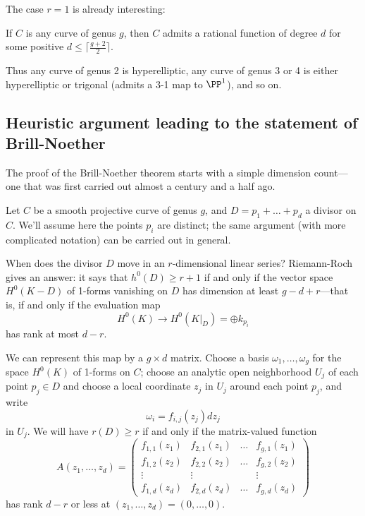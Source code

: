 The case $r=1$ is already interesting:

\begin{corollary}
If $C$ is any curve of genus $g$, then $C$ admits a rational function of degree $d$ for some positive $d \leq \lceil \frac{g+2}{2}\rceil$.
\end{corollary}

Thus any curve of genus 2 is hyperelliptic, any curve of genus 3 or 4 is either hyperelliptic or trigonal  (admits a 3-1 map to $\PP^1$), and so on.


\subsection{Heuristic argument leading to the statement of Brill-Noether}

The proof of the Brill-Noether theorem starts with a simple dimension count---one that was first carried out almost a century and a half ago. 

Let $C$ be a smooth projective curve of genus $g$, and $D = p_1 + \dots + p_d$ a divisor on $C$. We'll assume here the points $p_i$ are distinct; the same argument (with  more complicated notation) can be carried out in general.

When does the divisor $D$ move in an $r$-dimensional linear series? Riemann-Roch gives an answer: it says that $h^0(D) \geq r+1$ if and only if the vector space $H^0(K-D)$ of 1-forms vanishing on $D$ has dimension at least $g-d+r$---that is, if and only if the  evaluation map
$$
H^0(K) \to H^0(K|_D) = \oplus k_{p_i}
$$
has rank at most $d-r$. 

We can represent this map by a $g \times d$ matrix. Choose a basis $\omega_1,\dots,\omega_g$ for the space $H^0(K)$ of 1-forms on $C$; choose an analytic open neighborhood $U_j$ of each point $p_j \in D$ and choose a local coordinate $z_j$ in $U_j$ around each point $p_j$, and write
$$
\omega_i = f_{i,j}(z_j)dz_j
$$
in $U_j$. We will have $r(D) \geq r$ if and only if the  matrix-valued function
$$
A(z_1,\dots,z_d) = 
\begin{pmatrix}
f_{1,1}(z_1) & f_{2,1}(z_1) & \dots & f_{g,1}(z_1) \\
f_{1,2}(z_2) & f_{2,2}(z_2) & \dots & f_{g,2}(z_2) \\
\vdots & \vdots &  & \vdots \\
f_{1,d}(z_d) & f_{2,d}(z_d) & \dots & f_{g,d} (z_d)
\end{pmatrix}
$$
has rank $d-r$ or less at $(z_1,\dots,z_d) = (0,\dots,0)$.

